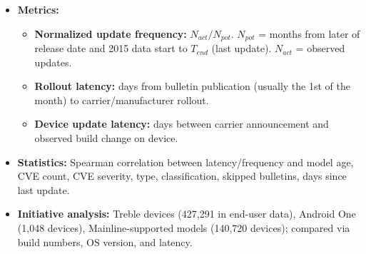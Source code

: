 \documentclass[11pt,a4paper]{article}
\begin{document}
\begin{enumerate}
\begin{itemize}[leftmargin=*, itemsep=1pt, topsep=2pt]
\begin{itemize}[itemsep=0pt]
            \item Anonymized HTTP POST logs from Android devices of a U.S.-based social network app, 2019.
            \item Four fields: request date, hashed account ID, user-agent string, country code.
            \item Build number in user-agent used as proxy for security updates.
            \item ``Device'' = unique pair of hashed user ID and model variant.
            \item ``Active'' device = accessed the app at least once a month for more than 10 months in 2019.
            \item Joined with carrier dataset by model variant and carrier.
        \end{itemize}
        \item \textbf{Metrics:}
        \begin{itemize}[itemsep=0pt]
            \item \textbf{Normalized update frequency:} $N_{act}/N_{pot}$. $N_{pot}$ = months from later of release date and 2015 data start to $T_{end}$ (last update). $N_{act}$ = observed updates.
            \item \textbf{Rollout latency:} days from bulletin publication (usually the 1st of the month) to carrier/manufacturer rollout.
            \item \textbf{Device update latency:} days between carrier announcement and observed build change on device.
        \end{itemize}
        \item \textbf{Statistics:} Spearman correlation between latency/frequency and model age, CVE count, CVE severity, type, classification, skipped bulletins, days since last update.
        \item \textbf{Initiative analysis:} Treble devices (427,291 in end-user data), Android One (1,048 devices), Mainline-supported models (140,720 devices); compared via build numbers, OS version, and latency.
    \end{itemize}


\end{enumerate}
\end{document}
